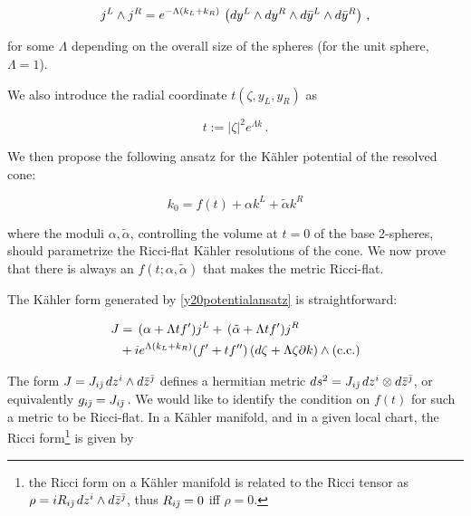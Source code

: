 \begin{equation}\label{spheresareEinstein}
	j^L \wedge j^R = e^{-\Lambda(k_L + k_R)}\, \left(dy^L \wedge dy^R \wedge d\bar y^L \wedge d\bar y^R\right)\,,
\end{equation}

for some $\Lambda$ depending on the overall size of the spheres (for the unit sphere, $\Lambda = 1$).

We also introduce the radial coordinate $t(\zeta,y_L,y_R)$ as 

\begin{equation}
	t := |\zeta|^2 e^{\Lambda k}\,.
\end{equation}

We then propose the following ansatz for the K\"ahler potential of the resolved cone:

\begin{equation}
	k_0 = f(t) + \alpha k^L + \tilde\alpha k^R \label{y20potentialansatz}
\end{equation}

where the moduli $\alpha,\tilde\alpha$, controlling the volume at $t=0$ of the base 2-spheres, should parametrize the Ricci-flat K\"ahler resolutions of the cone. We now prove that there is always an $f(t;\alpha,\tilde\alpha)$ that makes the metric Ricci-flat.

The K\"ahler form generated by \eqref{y20potentialansatz} is straightforward:

\begin{align}
	\begin{split}\label{y20kahlerformansatz}
	J &= \, (\alpha + \Lambda t f') j^L + \, (\tilde\alpha + \Lambda t f') j^R \\&+ i e^{\Lambda(k_L + k_R)} (f' + t f'') \, (d\zeta + \Lambda \zeta \partial k) \wedge (\mathrm{c.c.})
\end{split}
\end{align}

\newcommand{\fibral}{e^3 \wedge \bar e^{\bar 3}}




The form $J = J_{i\bar{\jmath}}\, dz^i \wedge d\bar z^{\bar\jmath}$ defines a hermitian metric $ds^2 = J_{i\bar{\jmath}}\, dz^i \otimes d\bar z^{\bar\jmath}$, or equivalently $g_{i\bar{\jmath}} = J_{i\bar{\jmath}}\,$. We would like to identify the condition on $f(t)$ for such a metric to be Ricci-flat. In a K\"ahler manifold, and in a given local chart, the Ricci form\footnote{the Ricci form on a K\"ahler manifold is related to the Ricci tensor as $\rho = i R_{i\bar{\jmath}} \, dz^i \wedge d\bar z^{\bar\jmath}$, thus $R_{i\bar{\jmath}} = 0$ iff $\rho = 0$. } is given by \cite{Ballmann}

